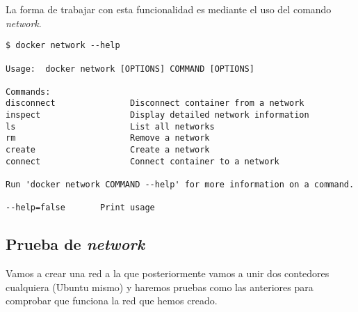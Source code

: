 	La forma de trabajar con esta funcionalidad es mediante el uso del comando \textit{\emph{network}}.
	
	\begin{lstlisting}[style=consola]
$ docker network --help

Usage:	docker network [OPTIONS] COMMAND [OPTIONS]

Commands:
disconnect               Disconnect container from a network
inspect                  Display detailed network information
ls                       List all networks
rm                       Remove a network
create                   Create a network
connect                  Connect container to a network

Run 'docker network COMMAND --help' for more information on a command.

--help=false       Print usage
	\end{lstlisting}
	
	\subsection{Prueba de \textit{network}}
	Vamos a crear una red a la que posteriormente vamos a unir dos contedores cualquiera (Ubuntu mismo) y haremos pruebas como las anteriores para comprobar que funciona la red que hemos creado.
	
